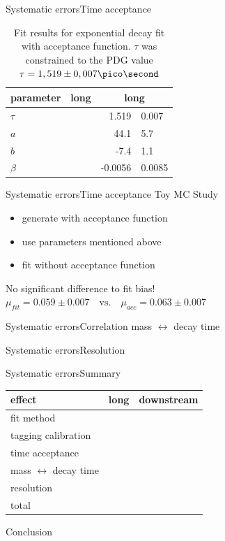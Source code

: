 \documentclass{beamer}
\begin{document}
\begin{frame}{Systematic errors}{Time acceptance}
\begin{table}
\caption{Fit results for exponential decay fit with acceptance function. $\tau$ was constrained to the PDG value $\tau = 1,519 \pm 0,007 \pico\second$}
\begin{tabular}{lr@{$\pm$}l r@{$\pm$}l}
\hline \hline 
parameter & \multicolumn{2}{c}{long} & \multicolumn{2}{c}{long} \\ \hline
$\tau$    & & &  1.519   & 0.007 \\
$a$       & & &  44.1    & 5.7 \\
$b$       & & &  -7.4    & 1.1 \\
$\beta$   & & &  -0.0056 & 0.0085 \\ 
\hline \hline
\end{tabular}
\end{table}
\end{frame}

\begin{frame}{Systematic errors}{Time acceptance}
Toy MC Study
\begin{itemize}
\item generate with acceptance function 
\item use parameters mentioned above
\item fit without acceptance function
\end{itemize}
\begin{center}
No significant difference to fit bias! \\
$\mu_{fit} = 0.059 \pm 0.007 \quad \text{vs.} \quad \mu_{acc} = 0.063 \pm 0.007$
\end{center}
\end{frame}

\begin{frame}{Systematic errors}{Correlation mass $\leftrightarrow$ decay time}

\end{frame}

\begin{frame}{Systematic errors}{Resolution}

\end{frame}

\begin{frame}{Systematic errors}{Summary}
\begin{center}
\begin{tabular}{l c c}
\hline \hline
effect & long & downstream \\ \hline
fit  method & & \\
tagging calibration & & \\
time acceptance & & \\
mass $\leftrightarrow$ decay time & & \\
resolution & & \\ \hline
total & & \\
\hline \hline
\end{tabular}
\end{center}

\end{frame}

\begin{frame}{Conclusion}

\end{frame}

\end{document}
